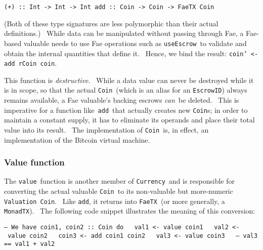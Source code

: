 \documentclass[11pt]{article}
\newcommand{\codeblock}[1]{\begin{mdframed}[
    backgroundcolor=header-color,
    linecolor=header-color,
    innertopmargin=10pt,
    ]{\texttt{#1}}\end{mdframed}}
\begin{document}
\codeblock{(+) :: Int -\textgreater{} Int -\textgreater{} Int\newline
add :: Coin -\textgreater{} Coin -\textgreater{} FaeTX Coin }

(Both of these type signatures are less polymorphic than their actual definitions.)  While data can be manipulated without passing through Fae, a Fae-based valuable needs to use Fae operations such as \texttt{useEscrow} to validate and obtain the internal quantities that define it.  Hence, we bind the result: \texttt{coin' }\texttt{\textless{}}\texttt{- add rCoin coin}.


\vspace{11pt}

This function is \textit{destructive}.  While a data value can never be destroyed while it is in scope, so that the actual \texttt{Coin} (which is an alias for an \texttt{EscrowID}) always remains available, a Fae valuable's backing escrows \textit{can} be deleted.  This is imperative for a function like \texttt{add} that actually creates new \texttt{Coin}s; in order to maintain a constant supply, it has to eliminate its operands and place their total value into its result.  The implementation of \texttt{Coin} is, in effect, an implementation of the Bitcoin virtual machine.

\subsubsection{Value function}
\vspace{5.5pt}

The \texttt{value} function is another member of \texttt{Currency} and is responsible for converting the actual valuable \texttt{Coin} to its non-valuable but more-numeric \texttt{Valuation Coin}.  Like \texttt{add}, it returns into \texttt{FaeTX} (or more generally, a \texttt{MonadTX}).  The following code snippet illustrates the meaning of this conversion:

\codeblock{-- We have coin1, coin2 :: Coin\newline
do\newline
  val1 \textless{}- value coin1\newline
  val2 \textless{}- value coin2\newline
  coin3 \textless{}- add coin1 coin2\newline
  val3 \textless{}- value coin3\newline
  -- val3 == val1 + val2}
\end{document}
